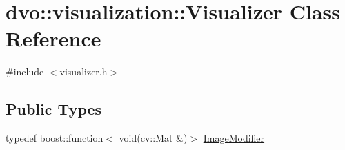 \hypertarget{classdvo_1_1visualization_1_1_visualizer}{}\section{dvo\+:\+:visualization\+:\+:Visualizer Class Reference}
\label{classdvo_1_1visualization_1_1_visualizer}


{\ttfamily \#include $<$visualizer.\+h$>$}

\subsection*{Public Types}
\begin{DoxyCompactItemize}
\item 
typedef boost\+::function$<$ void(cv\+::\+Mat \&)$>$ \mbox{\hyperlink{classdvo_1_1visualization_1_1_visualizer_ac33e0b53e7ef7be64e3230f6c91084a0}{Image\+Modifier}}
\end{DoxyCompactItemize}
